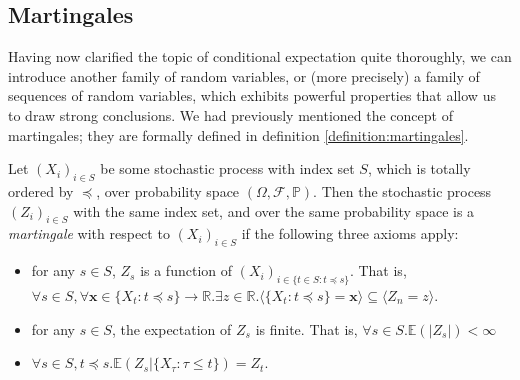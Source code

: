 	\subsection{Martingales}
	Having now clarified the topic of conditional expectation quite thoroughly, we can 
	introduce another family of random variables, or (more precisely) a family of sequences of 
	random variables, which exhibits powerful properties that allow us to draw strong 
	conclusions. We had previously mentioned the concept of martingales; they are formally 
	defined in definition \ref{definition:martingales}.
	\begin{definition}[Martingales]
		\label{definition:martingales}
		Let $(X_i)_{i\in S}$ be some stochastic process with index set $S$, which is 
		totally ordered by $\preceq$, over 
		probability space $(\Omega, \mathcal{F},\mathbb{P})$. Then the stochastic process 
		$(Z_i)_{i\in S}$ with the same index set, and over the same probability space is a 
		\emph{martingale} with respect to $(X_i)_{i\in S}$ if the following three axioms 
		apply:
		\begin{itemize}
			\item
			for any $s\in S$, $Z_s$ is a function of $(X_i)_{i \in \{t \in S : 
			t\preceq s\}}$. 
			That is, $\forall s \in S, \forall \mathbf{x}\in \{X_t : t\preceq s\} 
			\rightarrow \mathbb{R} . \exists z \in \mathbb{R} . \langle\{X_t : t 
			\preceq s\} = \mathbf{x}\rangle \subseteq \langle Z_n = z \rangle$.
			\item 
			for any $s\in S$, the expectation of $Z_s$ is finite. That is, 
			$\forall s \in S . \mathbb{E}(|Z_s|) < \infty$
			\item 
			$\forall s \in S, t\preceq s . \mathbb{E}(Z_{s} | \{X_\tau : 
			\tau \leq t\}) = Z_t$.
		\end{itemize}
	\end{definition}
	\begin{comment}
		It is worth highlighting that the third axiom states that the two random variables 
		are equivalent; i.e.\ that any outcome $\omega \in \Omega$ will result in the two 
		having the same value. \\
		It is also worth pointing out that the third axiom may be weakened to obtain 
		related but slightly different notions: $(Z_s)_{s\in S}$ is a \emph{submartingale} 
		with respect to $(X_s)_{s\in S}$ if $\forall s \in S, t\preceq s . \mathbb{E}(Z_{s
		} | \{X_\tau : \tau \leq t\}) \geq Z_t$, where an analogous definition applies to
		\emph{supermartingales}. \\
		Finally, the reader should note that the scope of this course will only include 
		what is known as \emph{discrete-time martingales}, where the index set $S$ is 
		countable. The definition given here also considers \emph{continuous-time 
		martingales} for the sake of completeness.
	\end{comment}

